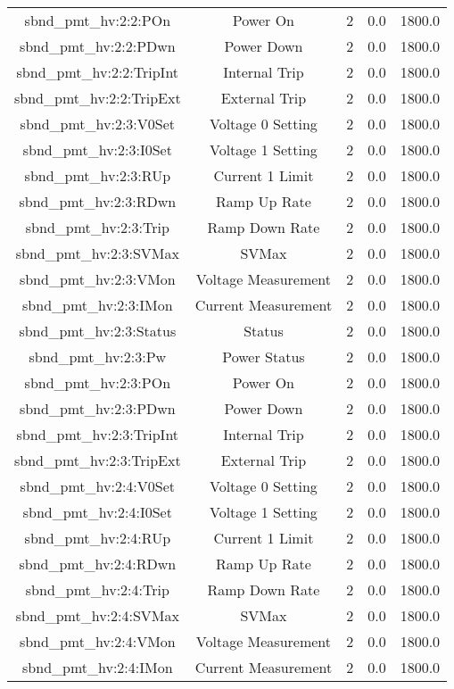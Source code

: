 \begin{center}
\begin{longtable}{c | c c c c }
sbnd\_pmt\_hv:2:2:POn & Power On & 2 & 0.0 & 1800.0\\ 
sbnd\_pmt\_hv:2:2:PDwn & Power Down & 2 & 0.0 & 1800.0\\ 
sbnd\_pmt\_hv:2:2:TripInt & Internal Trip & 2 & 0.0 & 1800.0\\ 
sbnd\_pmt\_hv:2:2:TripExt & External Trip & 2 & 0.0 & 1800.0\\ 
sbnd\_pmt\_hv:2:3:V0Set & Voltage 0 Setting & 2 & 0.0 & 1800.0\\ 
sbnd\_pmt\_hv:2:3:I0Set & Voltage 1 Setting & 2 & 0.0 & 1800.0\\ 
sbnd\_pmt\_hv:2:3:RUp & Current 1 Limit & 2 & 0.0 & 1800.0\\ 
sbnd\_pmt\_hv:2:3:RDwn & Ramp Up Rate & 2 & 0.0 & 1800.0\\ 
sbnd\_pmt\_hv:2:3:Trip & Ramp Down Rate & 2 & 0.0 & 1800.0\\ 
sbnd\_pmt\_hv:2:3:SVMax & SVMax & 2 & 0.0 & 1800.0\\ 
sbnd\_pmt\_hv:2:3:VMon & Voltage Measurement & 2 & 0.0 & 1800.0\\ 
sbnd\_pmt\_hv:2:3:IMon & Current Measurement & 2 & 0.0 & 1800.0\\ 
sbnd\_pmt\_hv:2:3:Status & Status & 2 & 0.0 & 1800.0\\ 
sbnd\_pmt\_hv:2:3:Pw & Power Status & 2 & 0.0 & 1800.0\\ 
sbnd\_pmt\_hv:2:3:POn & Power On & 2 & 0.0 & 1800.0\\ 
sbnd\_pmt\_hv:2:3:PDwn & Power Down & 2 & 0.0 & 1800.0\\ 
sbnd\_pmt\_hv:2:3:TripInt & Internal Trip & 2 & 0.0 & 1800.0\\ 
sbnd\_pmt\_hv:2:3:TripExt & External Trip & 2 & 0.0 & 1800.0\\ 
sbnd\_pmt\_hv:2:4:V0Set & Voltage 0 Setting & 2 & 0.0 & 1800.0\\ 
sbnd\_pmt\_hv:2:4:I0Set & Voltage 1 Setting & 2 & 0.0 & 1800.0\\ 
sbnd\_pmt\_hv:2:4:RUp & Current 1 Limit & 2 & 0.0 & 1800.0\\ 
sbnd\_pmt\_hv:2:4:RDwn & Ramp Up Rate & 2 & 0.0 & 1800.0\\ 
sbnd\_pmt\_hv:2:4:Trip & Ramp Down Rate & 2 & 0.0 & 1800.0\\ 
sbnd\_pmt\_hv:2:4:SVMax & SVMax & 2 & 0.0 & 1800.0\\ 
sbnd\_pmt\_hv:2:4:VMon & Voltage Measurement & 2 & 0.0 & 1800.0\\ 
sbnd\_pmt\_hv:2:4:IMon & Current Measurement & 2 & 0.0 & 1800.0\\ 

\end{longtable}
\end{center}
